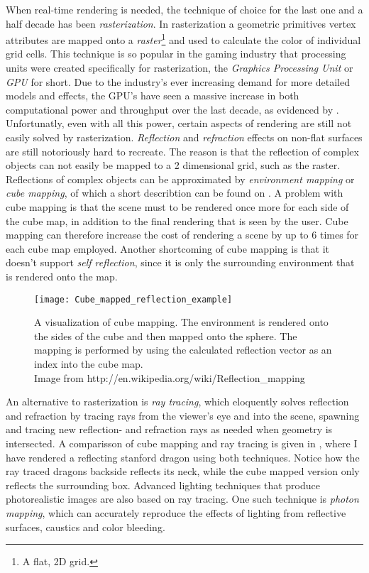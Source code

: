 When real-time rendering is needed, the technique of choice for the last one and
a half decade has been \textit{rasterization}. In rasterization a geometric
primitives vertex attributes are mapped onto a \textit{raster}\footnote{A flat,
  2D grid.} and used to calculate the color of individual grid cells. This
technique is so popular in the gaming industry that processing units were
created specifically for rasterization, the \textit{Graphics Processing Unit} or
\textit{GPU} for short. Due to the industry's ever increasing demand for more
detailed models and effects, the GPU's have seen a massive increase in both
computational power and throughput over the last decade, as evidenced by
. Unfortunatly, even with all this power, certain
aspects of rendering are still not easily solved by
rasterization. \textit{Reflection} and \textit{refraction} effects on non-flat
surfaces are still notoriously hard to recreate. The reason is that the
reflection of complex objects can not easily be mapped to a 2 dimensional grid,
such as the raster. Reflections of complex objects can be approximated by
\textit{environment mapping} or \textit{cube mapping}, of which a short
describtion can be found on . A problem with cube mapping is
that the scene must to be rendered once more for each side of the cube map, in
addition to the final rendering that is seen by the user. Cube mapping can
therefore increase the cost of rendering a scene by up to 6 times for each cube
map employed. Another shortcoming of cube mapping is that it doesn't support
\textit{self reflection}, since it is only the surrounding environment that is
rendered onto the map.

\begin{figure}
  \centering
  \texttt{[image: Cube\_mapped\_reflection\_example]}

  \vspace{3mm}
  \parbox{9.5cm}{\caption[Cube mapping visualized.]{A visualization of cube
      mapping. The environment is rendered onto the sides of the cube and then
      mapped onto the sphere. The mapping is performed by using the calculated
      reflection vector as an index into the cube map.\\Image from
      http://en.wikipedia.org/wiki/Reflection\_mapping}\label{fig:cubemap}}
\end{figure}


An alternative to rasterization is \textit{ray tracing}, which eloquently solves
reflection and refraction by tracing rays from the viewer's eye and into the
scene, spawning and tracing new reflection- and refraction rays as needed when
geometry is intersected. A comparisson of cube mapping and ray tracing is given
in , where I have rendered a reflecting stanford
dragon using both techniques. Notice how the ray traced dragons backside
reflects its neck, while the cube mapped version only reflects the surrounding
box. Advanced lighting techniques that produce photorealistic images are also
based on ray tracing. One such technique is \textit{photon mapping}, which can
accurately reproduce the effects of lighting from reflective surfaces, caustics
and color bleeding.

